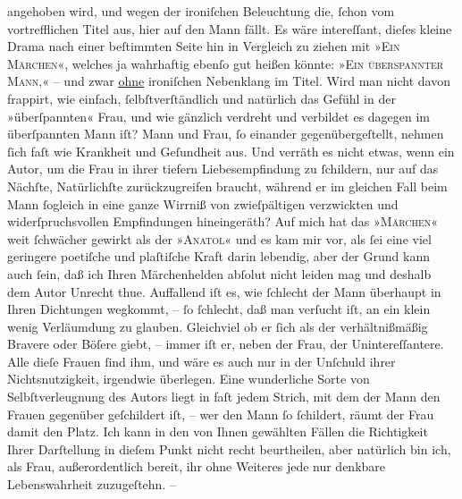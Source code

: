                angehoben wird, und wegen der ironiſchen Beleuchtung die,{ }ſchon vom vortrefflichen
               Titel aus, hier auf den Mann fällt. Es wäre intereſſant, dieſes kleine Drama nach
               einer beſtimmten Seite hin in Vergleich zu ziehen mit »\textsc{Ein Märchen}«, welches ja wahrhaftig ebenſo gut heißen könnte: »\textsc{Ein
                  überspannter Mann},« – und zwar \uline{ohne}
               ironiſchen Nebenklang im Titel. Wird man nicht davon frappirt, wie einfach,{ }ſelbſtverſtändlich und natürlich das Gefühl in der »überſpannten« Frau, und wie
               gänzlich verdreht und verbildet es dagegen im überſpannten Mann iſt? Mann und Frau,{ }ſo einander gegenübergeſtellt, nehmen{ }ſich faſt wie Krankheit und Geſundheit aus. Und
               verräth es nicht etwas, wenn ein Autor, um die Frau
               in ihrer tiefern Liebesempfindung zu{ }ſchildern, nur auf das Nächſte, Natürlichſte
               zurückzugreifen braucht, während er im gleichen Fall beim Mann{ }ſogleich in {\pb}eine ganze Wirrniß von zwieſpältigen
               verzwickten und widerſpruchsvollen Empfindungen hineingeräth? Auf mich hat das »\textsc{Märchen}« weit{ }ſchwächer gewirkt als der »\textsc{Anatol}« und es kam mir vor, als{ }ſei eine viel geringere poetiſche und plaſtiſche Kraft
               darin lebendig, aber der Grund kann auch{ }ſein, daß ich Ihren Märchenhelden abſolut
               nicht leiden mag und deshalb dem Autor Unrecht thue. Auffallend iſt es, wie{ }ſchlecht
               der Mann überhaupt in Ihren Dichtungen wegkommt, –{ }ſo{ }ſchlecht, daß man verſucht iſt,
               an ein klein wenig Verläumdung zu glauben. Gleichviel ob er{ }ſich als der
               verhältnißmäßig Bravere oder Böſere giebt, – immer iſt er, neben der Frau, der
               Unintereſſantere. Alle dieſe Frauen{ }ſind ihm, und wäre es auch nur in der Unſchuld
               ihrer Nichtsnutzigkeit, irgendwie überlegen. Eine wunderliche Sorte von
               Selbſtverleugnung \introOben{}des Autors\introOben{} liegt in faſt jedem Strich, mit
               dem der Mann den Frauen gegenüber geſchildert iſt, {\pb}– wer den Mann{ }ſo{ }ſchildert, räumt der
               Frau damit den Platz. Ich kann in den von Ihnen gewählten Fällen die Richtigkeit
               Ihrer Darſtellung in dieſem Punkt nicht recht beurtheilen, aber natürlich bin ich,
               als Frau, außerordentlich bereit, ihr ohne Weiteres jede nur denkbare Lebenswahrheit
               zuzugeſtehn. –\pend
           
